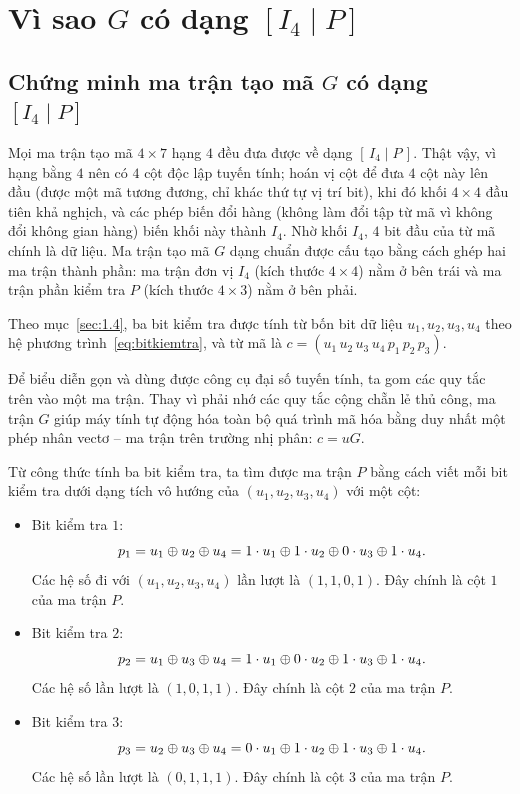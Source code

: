 \section{Vì sao \texorpdfstring{$G$}{G} có dạng \texorpdfstring{$[I_4 \mid P]$}{[I4 | P]}}
\label{sec:2.1}

\subsection{Chứng minh ma trận tạo mã \texorpdfstring{$G$}{G} có dạng \texorpdfstring{$[I_4 \mid P]$}{[I4 | P]}}
\label{ss:2.1.1}

Mọi ma trận tạo mã $4 \times 7$ hạng $4$ đều đưa được về dạng
$[\,I_4 \mid P\,]$. Thật vậy, vì hạng bằng $4$ nên có $4$ cột độc lập tuyến
tính; hoán vị cột để đưa $4$ cột này lên đầu (được một mã tương đương, chỉ khác
thứ tự vị trí bit), khi đó khối $4 \times 4$ đầu tiên khả nghịch, và các phép
biến đổi hàng (không làm đổi tập từ mã vì không đổi không gian hàng) biến khối
này thành $I_4$. Nhờ khối $I_4$, $4$ bit đầu của từ mã chính là dữ liệu. Ma
trận tạo mã $G$ dạng chuẩn được cấu tạo bằng cách ghép hai ma trận thành phần: ma trận đơn vị $I_4$ (kích thước
$4 \times 4$) nằm ở bên trái và ma trận phần kiểm tra $P$ (kích thước
$4 \times 3$) nằm ở bên phải.

Theo mục~\ref{sec:1.4}, ba bit kiểm tra được tính từ bốn bit dữ liệu
$u_1, u_2, u_3, u_4$ theo hệ phương trình~\eqref{eq:bitkiemtra}, và từ mã là
$c = (u_1\,u_2\,u_3\,u_4\,p_1\,p_2\,p_3)$.

Để biểu diễn gọn và dùng được công cụ đại số tuyến tính, ta gom các quy tắc
trên vào một ma trận. Thay vì phải nhớ các quy tắc cộng chẵn lẻ thủ công, ma
trận $G$ giúp máy tính tự động hóa toàn bộ quá trình mã hóa bằng duy nhất một
phép nhân vectơ -- ma trận trên trường nhị phân: $c = uG$.

Từ công thức tính ba bit kiểm tra, ta tìm được ma trận $P$ bằng cách viết mỗi
bit kiểm tra dưới dạng tích vô hướng của $(u_1, u_2, u_3, u_4)$ với một cột:

\begin{itemize}
  \item Bit kiểm tra $1$:
        \[
          p_1 = u_1 \oplus u_2 \oplus u_4
              = 1\cdot u_1 \oplus 1\cdot u_2 \oplus 0\cdot u_3 \oplus 1\cdot u_4 .
        \]
        Các hệ số đi với $(u_1, u_2, u_3, u_4)$ lần lượt là $(1,1,0,1)$. Đây
        chính là cột $1$ của ma trận $P$.
  \item Bit kiểm tra $2$:
        \[
          p_2 = u_1 \oplus u_3 \oplus u_4
              = 1\cdot u_1 \oplus 0\cdot u_2 \oplus 1\cdot u_3 \oplus 1\cdot u_4 .
        \]
        Các hệ số lần lượt là $(1,0,1,1)$. Đây chính là cột $2$ của ma trận
        $P$.
  \item Bit kiểm tra $3$:
        \[
          p_3 = u_2 \oplus u_3 \oplus u_4
              = 0\cdot u_1 \oplus 1\cdot u_2 \oplus 1\cdot u_3 \oplus 1\cdot u_4 .
        \]
        Các hệ số lần lượt là $(0,1,1,1)$. Đây chính là cột $3$ của ma trận
        $P$.
\end{itemize}

